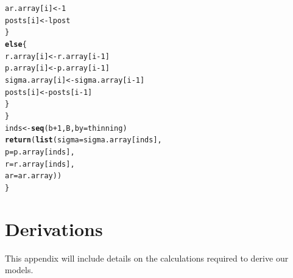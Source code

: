 \documentclass{article}\usepackage[]{graphicx}\usepackage[]{color}
\makeatletter
\newcommand{\hlnum}[1]{\textcolor[rgb]{0.686,0.059,0.569}{#1}}%
\newcommand{\hlopt}[1]{\textcolor[rgb]{0,0,0}{#1}}%
\newcommand{\hlstd}[1]{\textcolor[rgb]{0.345,0.345,0.345}{#1}}%
\newcommand{\hlkwa}[1]{\textcolor[rgb]{0.161,0.373,0.58}{\textbf{#1}}}%
\newcommand{\hlkwb}[1]{\textcolor[rgb]{0.69,0.353,0.396}{#1}}%
\newcommand{\hlkwc}[1]{\textcolor[rgb]{0.333,0.667,0.333}{#1}}%
\newcommand{\hlkwd}[1]{\textcolor[rgb]{0.737,0.353,0.396}{\textbf{#1}}}%
\newenvironment{kframe}{%
 \def\at@end@of@kframe{}%
 \ifinner\ifhmode%
  \def\at@end@of@kframe{\end{minipage}}%
  \begin{minipage}{\columnwidth}%
 \fi\fi%
 \def\FrameCommand##1{\hskip\@totalleftmargin \hskip-\fboxsep
 \colorbox{shadecolor}{##1}\hskip-\fboxsep
     \hskip-\linewidth \hskip-\@totalleftmargin \hskip\columnwidth}%
 \MakeFramed {\advance\hsize-\width
   \@totalleftmargin\z@ \linewidth\hsize
   \@setminipage}}%
 {\par\unskip\endMakeFramed%
 \at@end@of@kframe}
\newenvironment{knitrout}{}{} %
\makeatother
\begin{document}
\begin{knitrout}
\begin{kframe}
\begin{alltt}
      \hlstd{ar.array[i]} \hlkwb{<-} \hlnum{1}
      \hlstd{posts[i]} \hlkwb{<-} \hlstd{lpost}
    \hlstd{\}}
    \hlkwa{else}\hlstd{\{}
      \hlstd{r.array[i]} \hlkwb{<-} \hlstd{r.array[i}\hlopt{-}\hlnum{1}\hlstd{]}
      \hlstd{p.array[i]} \hlkwb{<-} \hlstd{p.array[i}\hlopt{-}\hlnum{1}\hlstd{]}
      \hlstd{sigma.array[i]} \hlkwb{<-} \hlstd{sigma.array[i}\hlopt{-}\hlnum{1}\hlstd{]}
      \hlstd{posts[i]} \hlkwb{<-} \hlstd{posts[i}\hlopt{-}\hlnum{1}\hlstd{]}
    \hlstd{\}}
  \hlstd{\}}
  \hlstd{inds} \hlkwb{<-} \hlkwd{seq}\hlstd{(b}\hlopt{+}\hlnum{1}\hlstd{, B,} \hlkwc{by}\hlstd{=thinning)}
  \hlkwd{return}\hlstd{(}\hlkwd{list}\hlstd{(}\hlkwc{sigma}\hlstd{=sigma.array[inds],}
              \hlkwc{p}\hlstd{=p.array[inds],}
              \hlkwc{r}\hlstd{=r.array[inds],}
              \hlkwc{ar}\hlstd{=ar.array))}
\hlstd{\}}
\end{alltt}
\end{kframe}
\end{knitrout}

\section{Derivations}
\label{a:derivation}
This appendix will include details on the calculations required to derive our models.
\end{document}
